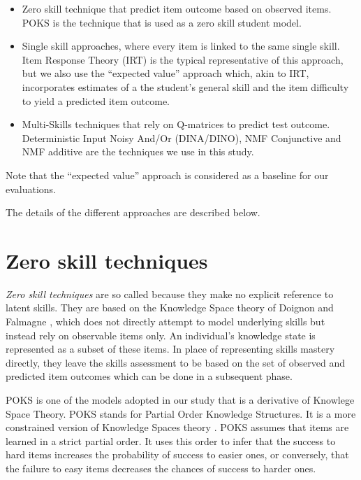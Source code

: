 \begin{itemize}

\item Zero skill technique that predict item outcome based on observed items. POKS is the technique that is used as a zero skill student model.
\item Single skill approaches, where every item is linked to the same single skill. Item Response Theory (IRT) is the typical representative of this approach, but we also use the ``expected value'' approach which, akin to IRT, incorporates estimates of a the student's general skill and the item difficulty to yield a predicted item outcome.
\item Multi-Skills techniques that rely on Q-matrices to predict test outcome.  Deterministic Input Noisy And/Or (DINA/DINO), NMF Conjunctive and \ac{NMF} additive are the techniques we use in this study.

\end{itemize}  
Note that the ``expected value'' approach is considered as a baseline for our evaluations. 

The details of the different approaches are described below.

\section{Zero skill techniques}

\textit{Zero skill techniques} are so called because they make no explicit reference to latent skills.  They are based on the Knowledge Space theory of Doignon and Falmagne \citep{Doignon1999,desmarais:umuai:2006}, which does not directly attempt to model underlying skills but instead rely on observable items only.  An individual's knowledge state is represented as a subset of these items. In place of representing skills mastery directly, they leave the skills assessment to be based on the set of observed and predicted item outcomes which can be done in a subsequent phase. 

POKS is one of the models adopted in our study that is a derivative of Knowlege Space Theory.  POKS stands for Partial Order Knowledge Structures.  It is a more constrained version of Knowledge Spaces theory \citep{desmarais:umuai:1995}.  POKS assumes that items are learned in a strict partial order.  It uses this order to infer that the success to hard items increases the probability of success to easier ones, or conversely, that the failure to easy items decreases the chances of success to harder ones.


